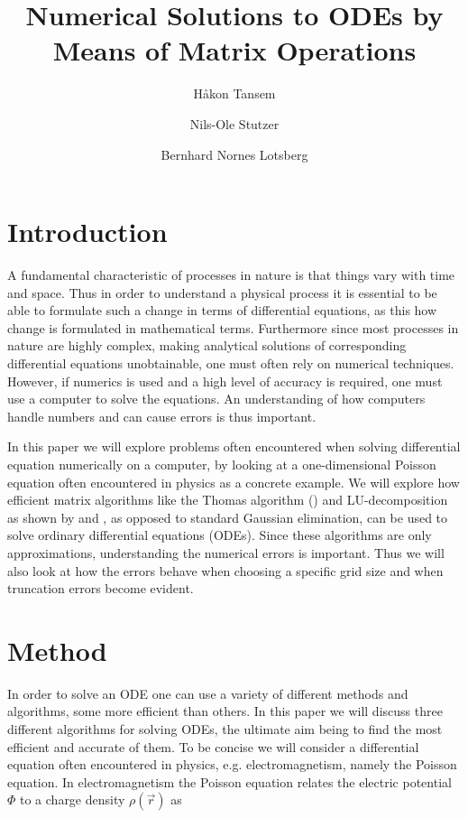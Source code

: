 \documentclass[twocolumn]{aastex62}
\begin{document}
\title{Numerical Solutions to ODEs by Means of Matrix Operations}




\author{Håkon Tansem}

\author{Nils-Ole Stutzer}

\author{Bernhard Nornes Lotsberg}

\begin{abstract}

\end{abstract}

\section{Introduction} \label{sec:intro}
A fundamental characteristic of processes in nature is that things vary with time and space. Thus in order to understand a physical process it is essential to be able to formulate such a change in terms of differential equations, as this how change is formulated in mathematical terms. Furthermore since most processes in nature are highly complex, making analytical solutions of corresponding differential equations unobtainable, one must often rely on numerical techniques. However, if numerics is used and a high level of accuracy is required, one must use a computer to solve the equations. An understanding of how computers handle numbers and can cause errors is thus important.

In this paper we will explore problems often encountered when solving differential equation numerically on a computer, by looking at a one-dimensional Poisson equation often encountered in physics as a concrete example. We will explore how efficient matrix algorithms like the Thomas algorithm (\citep[]{Jensen:2015}) and LU-decomposition as shown by \citep[p.142]{lay:2015} and \citep[p.668]{Boyd:2004}, as opposed to standard Gaussian elimination, can be used to solve ordinary differential equations (ODEs). Since these algorithms are only approximations, understanding the numerical errors is important. Thus we will also look at how the errors behave when choosing a specific grid size and when truncation errors become evident.   
 
\section{Method} \label{sec:method}
In order to solve an ODE one can use a variety of different methods and algorithms, some more efficient than others. In this paper we will discuss three different algorithms for solving ODEs, the ultimate aim being to find the most efficient and accurate of them. To be concise we will consider a differential equation often encountered in physics, e.g. electromagnetism, namely the Poisson equation. In electromagnetism the Poisson equation relates the electric potential $\Phi$ to a charge density $\rho(\vec{r})$ as 
\end{document}
